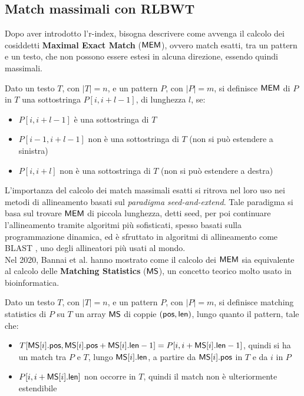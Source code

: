 \subsection{Match massimali con RLBWT}
Dopo aver introdotto l'r-index, bisogna descrivere come avvenga il
calcolo dei cosiddetti \textbf{Maximal Exact Match} ($\mbox{\rm {\sf MEM}}$), ovvero match
esatti, tra un pattern e un testo, che non 
possono essere estesi in alcuna direzione, essendo quindi massimali.
\begin{definizione}
  Dato un testo $T$, con $|T|=n$, e un pattern $P$, con $|P|=m$, si definisce
  $\mbox{\rm {\sf MEM}}$ di $P$ in $T$ una sottostringa $P[i,i+l-1]$, di lunghezza $l$,
  se:
  \begin{itemize}
    \item $P[i,i+l-1]$ è una sottostringa di $T$
    \item $P[i-1,i+l-1]$ non è una sottostringa di $T$ (non si può estendere a
    sinistra) 
    \item $P[i,i+l]$ non è una sottostringa di $T$ (non si può estendere a
    destra) 
  \end{itemize}
\end{definizione}
L'importanza del calcolo dei match massimali esatti si ritrova nel loro uso nei
metodi di allineamento basati sul \textit{paradigma seed-and-extend}.
Tale paradigma si basa sul trovare
$\mbox{\rm {\sf MEM}}$ di piccola lunghezza, detti seed, per poi continuare
l'allineamento tramite algoritmi più sofisticati, spesso basati sulla
programmazione dinamica, ed è sfruttato in algoritmi di allineamento come BLAST
\cite{blast}, uno degli allineatori più usati al mondo. \\
Nel 2020, Bannai et al. \cite{bannai} hanno mostrato come il calcolo dei
$\mbox{\rm {\sf MEM}}$ sia equivalente al calcolo delle \textbf{Matching Statistics} ($\mbox{\rm {\sf MS}}$), 
un concetto teorico molto usato in
bioinformatica. 
\begin{definizione}
  Dato un testo $T$, con $|T|=n$, e un pattern $P$, con $|P|=m$, si definisce
  matching statistics di $P$ su $T$ un array $\mbox{\rm {\sf MS}}$ di coppie $(\mbox{\rm {\sf pos}},
  \mbox{\rm {\sf len}})$, lungo quanto il pattern, tale che:
  \begin{itemize}
    \item $T[\mbox{\rm {\sf MS}}[i].\mbox{\rm {\sf pos}},\mbox{\rm {\sf MS}}[i].\mbox{\rm {\sf pos}}+\mbox{\rm {\sf MS}}[i].\mbox{\rm {\sf len}}-1]=
    P[i,i+\mbox{\rm {\sf MS}}[i].\mbox{\rm {\sf len}}-1]$, quindi si ha
    un match tra $P$ e $T$, lungo $\mbox{\rm {\sf MS}}[i].\mbox{\rm {\sf len}}$, a partire da $\mbox{\rm {\sf MS}}[i].\mbox{\rm {\sf pos}}$ 
    in $T$ e da $i$ in $P$
    \item $P[i,i+\mbox{\rm {\sf MS}}[i].\mbox{\rm {\sf len}}]$ non occorre in $T$, quindi il match non è
    ulteriormente estendibile 
  \end{itemize}
\end{definizione}
